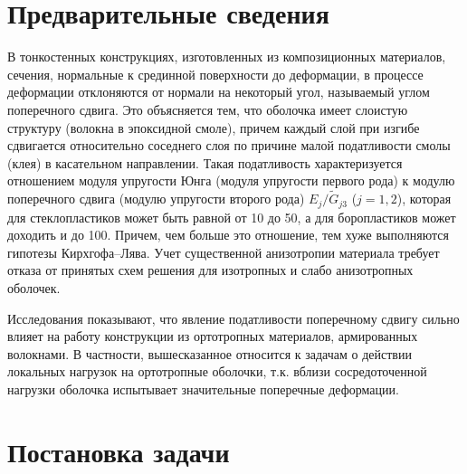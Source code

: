 \documentclass[press]{vestnik}
\begin{document}
\section{Предварительные сведения }

В тонкостенных конструкциях, изготовленных из композиционных материалов, 
сечения, нормальные к срединной поверхности до деформации, в процессе 
деформации отклоняются от нормали на некоторый угол, называемый углом 
поперечного сдвига. Это объясняется тем, что оболочка имеет слоистую 
структуру (волокна в эпоксидной смоле), причем каждый слой при изгибе 
сдвигается относительно соседнего слоя по причине малой податливости смолы 
(клея) в касательном направлении. Такая податливость характеризуется отношением модуля упругости Юнга (модуля упругости первого рода) к модулю поперечного сдвига (модулю упругости второго рода) $E_{j}/\tilde{{G}}_{j3}$ ($j=1, 2$), 
которая для стеклопластиков может быть равной от 10 до 50, а для 
боропластиков может доходить и до 100. Причем, чем больше это отношение, тем 
хуже выполняются гипотезы Кирхгофа--Лява. Учет существенной анизотропии 
материала требует отказа от принятых схем решения для изотропных и слабо 
анизотропных оболочек.

Исследования показывают, что явление податливости поперечному сдвигу сильно 
влияет на работу конструкции из ортотропных материалов, армированных 
волокнами. В частности, вышесказанное относится к задачам о действии 
локальных нагрузок на ортотропные оболочки, т.к. вблизи сосредоточенной 
нагрузки оболочка испытывает значительные поперечные деформации.

\section{Постановка задачи }
\end{document}
